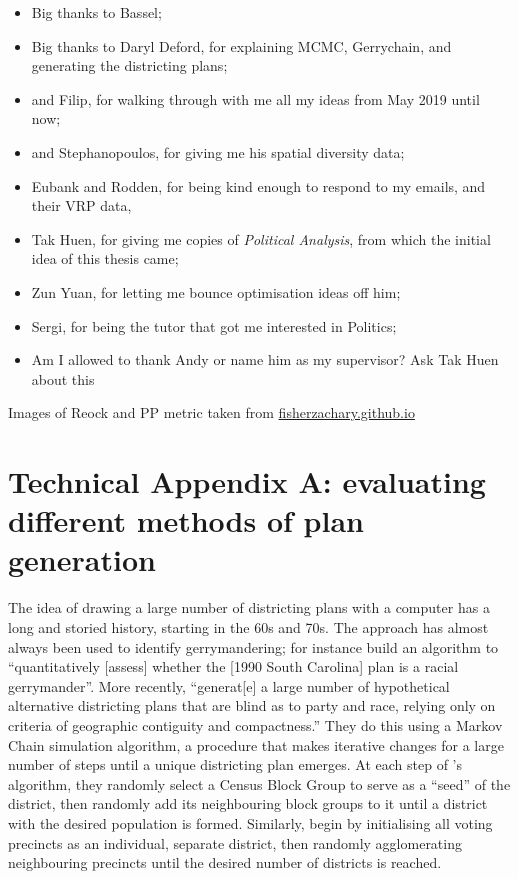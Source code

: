\documentclass[]{article}
\providecommand{\tightlist}{%
  \setlength{\itemsep}{0pt}\setlength{\parskip}{0pt}}
\begin{document}
\begin{itemize}
\tightlist
\item
  Big thanks to Bassel;
\item
  Big thanks to Daryl Deford, for explaining MCMC, Gerrychain, and
  generating the districting plans;
\item
  and Filip, for walking through with me all my ideas from May 2019
  until now;
\item
  and Stephanopoulos, for giving me his spatial diversity data;
\item
  Eubank and Rodden, for being kind enough to respond to my emails, and
  their VRP data,
\item
  Tak Huen, for giving me copies of \emph{Political Analysis}, from
  which the initial idea of this thesis came;
\item
  Zun Yuan, for letting me bounce optimisation ideas off him;
\item
  Sergi, for being the tutor that got me interested in Politics;
\item
  Am I allowed to thank Andy or name him as my supervisor? Ask Tak Huen
  about this
\end{itemize}

Images of Reock and PP metric taken from
\href{https://fisherzachary.github.io/public/r-output.html}{fisherzachary.github.io}

\pagebreak{}

\hypertarget{technical-appendix-a-evaluating-different-methods-of-plan-generation}{%
\section{Technical Appendix A: evaluating different methods of plan
generation}\label{technical-appendix-a-evaluating-different-methods-of-plan-generation}}

The idea of drawing a large number of districting plans with a computer
has a long and storied history, starting in the 60s and 70s. The
approach has almost always been used to identify gerrymandering; for
instance \cite{ccd2000} build an algorithm to ``quantitatively
{[}assess{]} whether the {[}1990 South Carolina{]} plan is a racial
gerrymander''. More recently, \cite{cr2013} ``generat{[}e{]} a large
number of hypothetical alternative districting plans that are blind as
to party and race, relying only on criteria of geographic contiguity and
compactness.'' They do this using a Markov Chain simulation algorithm, a
procedure that makes iterative changes for a large number of steps until
a unique districting plan emerges. At each step of
\citeauthor{ccd2000}'s algorithm, they randomly select a Census Block
Group to serve as a ``seed'' of the district, then randomly add its
neighbouring block groups to it until a district with the desired
population is formed. Similarly, \citeauthor{cr2013} begin by
initialising all voting precincts as an individual, separate district,
then randomly agglomerating neighbouring precincts until the desired
number of districts is reached.
\end{document}
